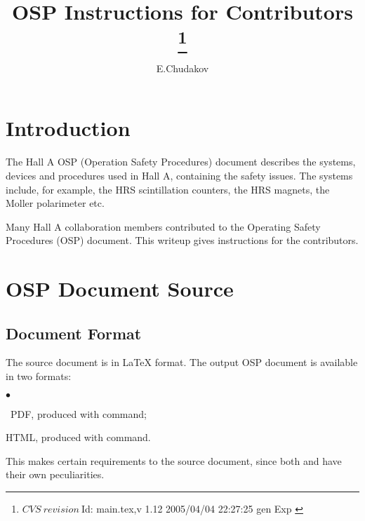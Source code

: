 \documentclass[12pt,letterpaper]{article}
\begin{document}
\color{\Mcol}
\pagestyle{headings}

\begin{titlepage}
\title{{\bf OSP Instructions for Contributors
\thanks{
 $CVS~revision~ $Id: main.tex,v 1.12 2005/04/04 22:27:25 gen Exp $ $
}
}}

\author{E.Chudakov} 
\setcounter{tocdepth}{3}
\end{titlepage} 
\maketitle 
 
\tableofcontents



\section{Introduction}
\label{sec:intro}

  The Hall A\cite{Hallawww} OSP (Operation Safety Procedures) document describes  
  the systems, devices and procedures used in Hall A, containing
  the safety issues. The systems include, for example, the HRS
  scintillation counters, the HRS magnets, the Moller polarimeter
  etc. 

  Many Hall A collaboration members contributed to the Operating Safety 
  Procedures (OSP) document. This writeup gives instructions for the
  contributors\cite{OSPgen}.

\section{OSP Document Source}
\label{sec:document}
   
\subsection{Document Format}
\label{sec:format}   

  The source document is in \LaTeX{} format.
  The output OSP document is available in two formats: 
  \begin{list}{$\bullet$}{\setlength{\itemsep}{-0.15cm}}
    \item ~PDF, produced with  command; 
    \item HTML, produced with  command. 
  \end{list}
  This makes certain requirements to the source document,
  since both  and  have their own
  peculiarities.
\end{document}
